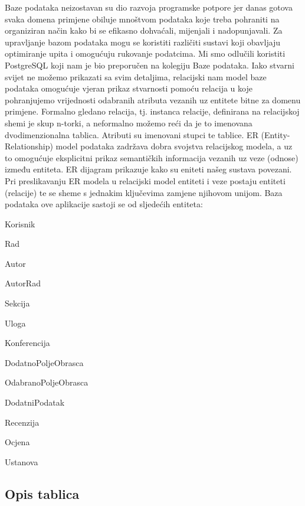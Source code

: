 			Baze podataka neizostavan su dio razvoja programske potpore jer danas gotova svaka domena primjene obiluje mnoštvom podataka koje treba pohraniti na organiziran način kako bi se efikasno dohvaćali, mijenjali i nadopunjavali. Za upravljanje bazom podataka mogu se koristiti različiti sustavi koji obavljaju optimiranje upita i omogućuju rukovanje podatcima. Mi smo odlučili koristiti PostgreSQL koji nam je bio preporučen na kolegiju Baze podataka. \newline Iako stvarni svijet ne možemo prikazati sa svim detaljima, relacijski nam model baze podataka omogućuje vjeran prikaz stvarnosti pomoću relacija u koje pohranjujemo vrijednosti odabranih atributa vezanih uz entitete bitne za domenu primjene. Formalno gledano relacija, tj. instanca relacije, definirana na relacijskoj shemi je skup n-torki, a neformalno možemo reći da je to imenovana dvodimenzionalna tablica. Atributi su imenovani stupci te tablice. ER (Entity-Relationship) model podataka zadržava dobra svojstva relacijskog modela, a uz to omogućuje eksplicitni prikaz semantičkih informacija vezanih uz veze (odnose) između entiteta. ER dijagram prikazuje kako su eniteti našeg sustava povezani. Pri preslikavanju ER modela u relacijski model entiteti i veze postaju entiteti (relacije) te se sheme s jednakim ključevima zamjene njihovom unijom.
		Baza podataka ove aplikacije sastoji se od sljedećih entiteta:
		\begin{packed_item}
			\item Korisnik
			\item Rad
			\item Autor
			\item AutorRad
			\item Sekcija
			\item Uloga
			\item Konferencija
			\item DodatnoPoljeObrasca
			\item OdabranoPoljeObrasca
			\item DodatniPodatak
			\item Recenzija
			\item Ocjena
			\item Ustanova
		\end{packed_item}
		
			\subsection{Opis tablica}
			

